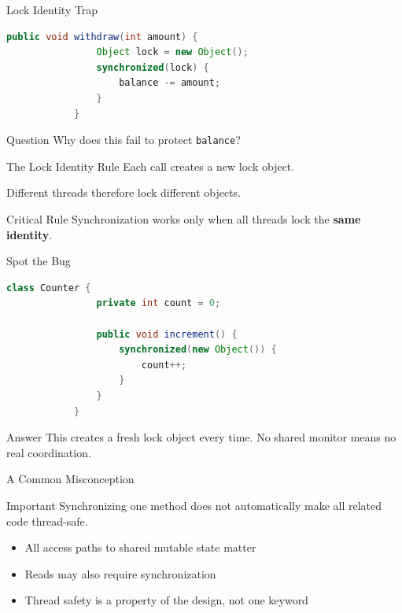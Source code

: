 \documentclass[aspectratio=169,11pt]{beamer}
\begin{document}
	\begin{frame}[fragile]{Lock Identity Trap}
		\begin{lstlisting}[language=Java]
			public void withdraw(int amount) {
				Object lock = new Object();
				synchronized(lock) {
					balance -= amount;
				}
			}
		\end{lstlisting}
		
		\bigskip
		\begin{alertblock}{Question}
			Why does this fail to protect \texttt{balance}?
		\end{alertblock}
	\end{frame}
	
	\begin{frame}{The Lock Identity Rule}
		Each call creates a new lock object.
		
		\bigskip
		Different threads therefore lock different objects.
		
		\bigskip
		\begin{alertblock}{Critical Rule}
			Synchronization works only when all threads lock the \textbf{same identity}.
		\end{alertblock}
	\end{frame}
	
	\begin{frame}[fragile]{Spot the Bug}
		\begin{lstlisting}[language=Java]
			class Counter {
				private int count = 0;
				
				public void increment() {
					synchronized(new Object()) {
						count++;
					}
				}
			}
		\end{lstlisting}
		
		\vspace{0.2cm}
		\begin{block}{Answer}
			This creates a fresh lock object every time.
			No shared monitor means no real coordination.
		\end{block}
	\end{frame}
	
	\begin{frame}{A Common Misconception}
		\begin{alertblock}{Important}
			Synchronizing one method does not automatically make
			all related code thread-safe.
		\end{alertblock}
		
		\vspace{0.3cm}
		\begin{itemize}
			\item All access paths to shared mutable state matter
			\item Reads may also require synchronization
			\item Thread safety is a property of the design, not one keyword
		\end{itemize}
	\end{frame}
	
\end{document}
